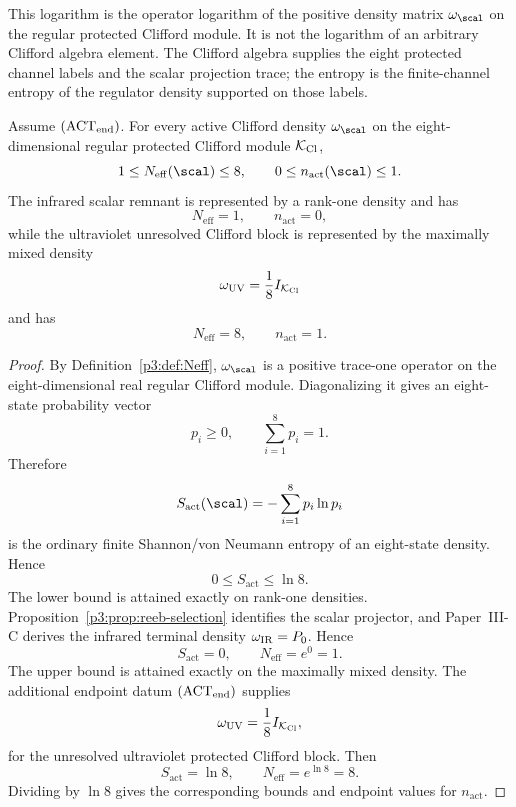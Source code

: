 \documentclass[11pt,a4paper]{article}
\begin{document}
\begin{remark}
This logarithm is the operator logarithm of the positive
density matrix \(\omega_{\scal}\) on the regular protected Clifford module.  It is not the logarithm
of an arbitrary Clifford algebra element.  The Clifford algebra supplies the eight protected channel
labels and the scalar projection trace; the entropy is the finite-channel entropy of the regulator
density supported on those labels.
\end{remark}


\begin{lemma}
\label{p3:lem:Neff_entropy_endpoints}
Assume \((\mathrm{ACT}_{\rm end})\).  For every active Clifford density \(\omega_{\scal}\) on the eight-dimensional regular protected
Clifford module \(\mathcal K_{\rm Cl}\),
\[
1\le N_{\mathrm{eff}}(\scal)\le 8,
\qquad
0\le n_{\mathrm{act}}(\scal)\le 1.
\]
The infrared scalar remnant is represented by a rank-one density and has
\[
N_{\mathrm{eff}}=1,\qquad n_{\mathrm{act}}=0,
\]
while the ultraviolet unresolved Clifford block is represented by the maximally mixed density
\[
\omega_{\rm UV}=\frac18 I_{\mathcal K_{\rm Cl}}
\]
and has
\[
N_{\mathrm{eff}}=8,\qquad n_{\mathrm{act}}=1.
\]
\end{lemma}

\begin{proof}
By Definition~\ref{p3:def:Neff}, \(\omega_{\scal}\) is a positive trace-one operator on the
eight-dimensional real regular Clifford module.  Diagonalizing it gives an eight-state probability
vector
\[
        p_i\ge0,\qquad \sum_{i=1}^8p_i=1.
\]
Therefore
\[
        S_{\mathrm{act}}(\scal)
        =
        -\sum_{i=1}^8p_i\ln p_i
\]
is the ordinary finite Shannon/von Neumann entropy of an eight-state density.  Hence
\[
        0\le S_{\mathrm{act}}\le \ln 8.
\]
The lower bound is attained exactly on rank-one densities.
Proposition~\ref{p3:prop:reeb-selection} identifies the scalar projector, and
Paper~III-C derives the infrared terminal density
\(\omega_{\rm IR}=P_0\).  Hence
\[
        S_{\mathrm{act}}=0,
        \qquad
        N_{\mathrm{eff}}=e^0=1.
\]
The upper bound is attained exactly on the maximally mixed density.  The
additional endpoint datum \((\mathrm{ACT}_{\rm end})\) supplies
\[
        \omega_{\rm UV}=\frac18I_{\mathcal K_{\rm Cl}},
\]
for the unresolved ultraviolet protected Clifford block.  Then
\[
        S_{\mathrm{act}}=\ln8,
        \qquad
        N_{\mathrm{eff}}=e^{\ln8}=8.
\]
Dividing by \(\ln8\) gives the corresponding bounds and endpoint values for
\(n_{\mathrm{act}}\).
\end{proof}
\end{document}
